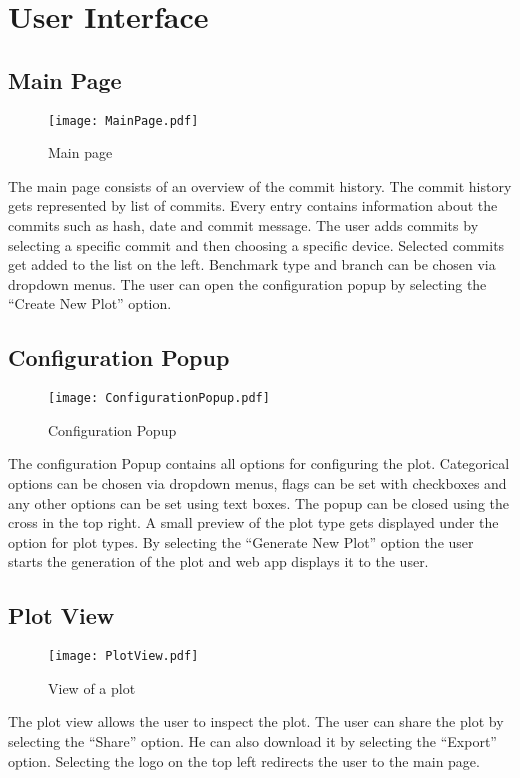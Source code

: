 \section{User Interface}

\subsection{Main Page}

\begin{figure}[H]
    \texttt{[image: MainPage.pdf]}
    \caption{Main page}
    \label{ui:main}
\end{figure}

The main page consists of an overview of the commit history. The commit history gets represented by list of commits. Every entry contains information about the commits such as hash, date and commit message. The user adds commits by selecting a specific commit and then choosing a specific device. Selected commits get added to the list on the left. Benchmark type and branch can be chosen via dropdown menus. The user can open the configuration popup by selecting the \enquote{Create New Plot} option.

\subsection{Configuration Popup}

\begin{figure}[H]
    \texttt{[image: ConfigurationPopup.pdf]}
    \caption{Configuration Popup}
    \label{ui:config}
\end{figure}

The configuration Popup contains all options for configuring the \gls{plot}. Categorical options can be chosen via dropdown menus, flags can be set with checkboxes and any other options can be set using text boxes. The popup can be closed using the cross in the top right. A small preview of the plot type gets displayed under the option for plot types. By selecting the \enquote{Generate New Plot} option the user starts the generation of the \gls{plot} and web app displays it to the user.

\subsection{Plot View}

\begin{figure}[H]
    \texttt{[image: PlotView.pdf]}
    \caption{View of a \gls{plot}}
    \label{ui:plot}
\end{figure}

The plot view allows the user to inspect the \gls{plot}. The user can share the \gls{plot} by selecting the \enquote{Share} option. He can also download it by selecting the \enquote{Export} option. Selecting the logo on the top left redirects the user to the main page.
